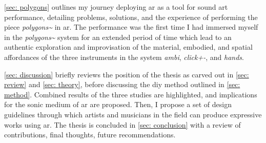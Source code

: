 \autoref{sec: polygons} outlines my journey deploying \gls{ar} as a tool for sound \gls{art} performance, detailing problems, solutions, and the experience of performing the piece \textit{polygons\textasciitilde{}} in \gls{ar}. The performance was the first time I had immersed myself in the \textit{polygons\textasciitilde{}} system for an extended period of time which lead to an authentic exploration and improvisation of the material, embodied, and spatial affordances of the three instruments in the system \textit{ambi}, \textit{click+-}, and \textit{hands}.

\autoref{sec: discussion} briefly reviews the position of the thesis as carved out in \autoref{sec: review} and \autoref{sec: theory}, before discussing the \gls{diy} method outlined in \autoref{sec: method}. Combined results of the three studies are highlighted, and implications for the sonic medium of \gls{ar} are proposed. Then, I propose a set of design guidelines through which artists and musicians in the field can produce expressive works using \gls{ar}. The thesis is concluded in \autoref{sec: conclusion} with a review of contributions, final thoughts, future recommendations.

